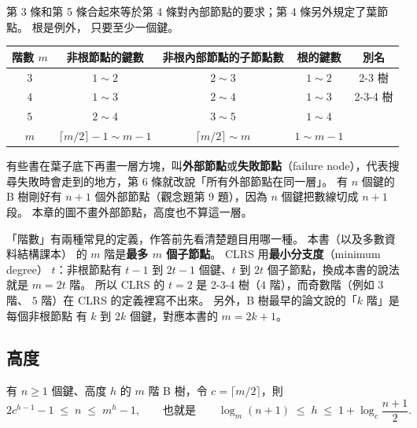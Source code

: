 第 3 條和第 5 條合起來等於第 4 條對內部節點的要求；第 4 條另外規定了葉節點。 根是例外，
只要至少一個鍵。

\begin{center}
\begin{tabular}{ccccc}
\toprule
階數 $m$ & 非根節點的鍵數 & 非根內部節點的子節點數 & 根的鍵數 & 別名 \\
\midrule
$3$ & $1 \sim 2$ & $2 \sim 3$ & $1 \sim 2$ & 2-3 樹 \\
$4$ & $1 \sim 3$ & $2 \sim 4$ & $1 \sim 3$ & 2-3-4 樹 \\
$5$ & $2 \sim 4$ & $3 \sim 5$ & $1 \sim 4$ & \\
$m$ & $\lceil m/2 \rceil - 1 \sim m - 1$ & $\lceil m/2 \rceil \sim m$ & $1 \sim m - 1$ & \\
\bottomrule
\end{tabular}
\end{center}

有些書在葉子底下再畫一層方塊，叫\textbf{外部節點}或\textbf{失敗節點}（failure
node），代表搜尋失敗時會走到的地方，第 6 條就改說「所有外部節點在同一層」。 有 $n$
個鍵的 B 樹剛好有 $n + 1$ 個外部節點（觀念題第 9 題），因為 $n$ 個鍵把數線切成
$n + 1$ 段。 本章的圖不畫外部節點，高度也不算這一層。

\begin{examnote}
「階數」有兩種常見的定義，作答前先看清楚題目用哪一種。 本書（以及多數資料結構課本）
的 $m$ 階是\textbf{最多 $m$ 個子節點}。 CLRS 用\textbf{最小分支度}（minimum degree）
$t$：非根節點有 $t - 1$ 到 $2t - 1$ 個鍵、$t$ 到 $2t$ 個子節點，換成本書的說法就是
$m = 2t$ 階。 所以 CLRS 的 $t = 2$ 是 2-3-4 樹（$4$ 階），而奇數階（例如 $3$ 階、
$5$ 階）在 CLRS 的定義裡寫不出來。 另外，B 樹最早的論文說的「$k$ 階」是每個非根節點
有 $k$ 到 $2k$ 個鍵，對應本書的 $m = 2k + 1$。
\end{examnote}

\subsection{高度}
\label{sec:mw-height}

\begin{theorem}
\label{thm:mw-height}
有 $n \ge 1$ 個鍵、高度 $h$ 的 $m$ 階 B 樹，令 $c = \lceil m/2 \rceil$，則
\[
2c^{h-1} - 1 \;\le\; n \;\le\; m^h - 1,
\qquad\text{也就是}\qquad
\log_m(n + 1) \;\le\; h \;\le\; 1 + \log_c \frac{n + 1}{2}.
\]
\end{theorem}

